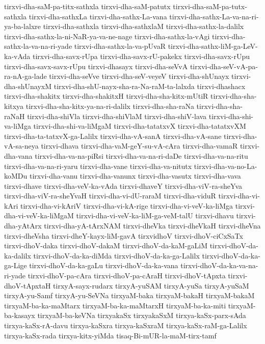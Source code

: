 {tirxvi-dha-saM-pa-titx-sathxla
tirxvi-dha-saM-patutx
tirxvi-dha-saM-pa-tutx-sathxla
tirxvi-dha-sathxLa
tirxvi-dha-sathx-La-vana
tirxvi-dha-sathx-La-va-na-ri-ya-ba-lalxre
tirxvi-dha-sathxla
tirxvi-dha-sathxlaM
tirxvi-dha-sathx-la-dalilx
tirxvi-dha-sathx-la-ni-NaR-ya-va-ne-nage
tirxvi-dha-sathx-la-vAgi
tirxvi-dha-sathx-la-va-na-ri-yade
tirxvi-dha-sathx-la-va-pUvaR
tirxvi-dha-sathx-liM-ga-LeV-ka-vAda
tirxvi-dha-savx-rUpa
tirxvi-dha-savx-rU-pakekx
tirxvi-dha-savx-rUpu
tirxvi-dha-savx-savx-rUpu
tirxvi-dhasayx
tirxvi-dha-seVvA
tirxvi-dha-seV-vA-pa-ra-nA-ga-lade
tirxvi-dha-seVve
tirxvi-dha-seV-veyeV
tirxvi-dha-shUnayx
tirxvi-dha-shUnayxM
tirxvi-dha-shU-nayx-sha-ra-Na-raM-ta-lalxda
tirxvi-dhashacx
tirxvi-dha-shakitx
tirxvi-dha-shakitxH
tirxvi-dha-sha-kitx-mUtiR
tirxvi-dha-sha-kitxya
tirxvi-dha-sha-kitx-ya-na-ri-dalilx
tirxvi-dha-sha-raNa
tirxvi-dha-sha-raNaH
tirxvi-dha-shiVla
tirxvi-dha-shiVlaM
tirxvi-dha-shiV-lava
tirxvi-dha-shi-va-liMga
tirxvi-dha-shi-va-liMgaM
tirxvi-dha-tatatxvX
tirxvi-dha-tatatxvXM
tirxvi-dha-ta-tatxvX-ga-Lalilx
tirxvi-dha-vA-sanA
tirxvi-dha-vA-sane
tirxvi-dha-vA-sa-neya
tirxvi-dhava
tirxvi-dha-vaM-geY-su-vA-cAra
tirxvi-dha-vamaR
tirxvi-dha-vana
tirxvi-dha-va-na-piRsi
tirxvi-dha-va-na-ri-daDe
tirxvi-dha-va-na-ritu
tirxvi-dha-va-na-ri-yaru
tirxvi-dha-vane
tirxvi-dha-va-nitutx
tirxvi-dha-va-no-La-koMDu
tirxvi-dha-vanu
tirxvi-dha-vanunx
tirxvi-dha-vasutx
tirxvi-dha-vava
tirxvi-dhave
tirxvi-dha-veV-ka-vAda
tirxvi-dhaveY
tirxvi-dha-viV-ra-sheYva
tirxvi-dha-viV-ra-sheYvaH
tirxvi-dha-vi-dU-raraM
tirxvi-dha-viduR
tirxvi-dha-vi-kAri
tirxvi-dha-vi-kAriV
tirxvi-dha-vi-kA-rige
tirxvi-dha-vi-veV-ka-liMga
tirxvi-dha-vi-veV-ka-liMgaM
tirxvi-dha-vi-veV-ka-liM-ga-veM-talU
tirxvi-dhavu
tirxvi-dha-yAtArx
tirxvi-dha-yA-tArxNAM
tirxvi-dheVka
tirxvi-dheVkaH
tirxvi-dheVna
tirxvi-dheVsha
tirxvi-dheY-kayx-liM-gavA
tirxvidhoV
tirxvi-dhoV-ciCxSaTx
tirxvi-dhoV-daka
tirxvi-dhoV-dakaM
tirxvi-dhoV-da-kaM-gaLiM
tirxvi-dhoV-da-ka-dalilx
tirxvi-dhoV-da-ka-diMda
tirxvi-dhoV-da-ka-ga-Lalilx
tirxvi-dhoV-da-ka-ga-Lige
tirxvi-dhoV-da-ka-gaLu
tirxvi-dhoV-da-ka-vana
tirxvi-dhoV-da-ka-va-na-ri-yade
tirxvi-dhoV-pa-cAra
tirxvi-dhoV-pa-cAraH
tirxvi-dhoV-tApxta
tirxvi-dhoV-tApxtaH
tirxyA-sayx-rudarx
tirxyA-yuSAM
tirxyA-yuSa
tirxyA-yuSaM
tirxyA-yu-Samf
tirxyA-yu-SeVNa
tirxyaM-baka
tirxyaM-bakaH
tirxyaM-bakaM
tirxyaM-ba-ka-maMtarx
tirxyaM-ba-ka-maMtarxH
tirxyaM-ba-ka-miti
tirxyaM-ba-kasayx
tirxyaM-ba-keVNa
tirxyakaSx
tirxyakaSxM
tirxya-kaSx-parx-sAda
tirxya-kaSx-rA-davu
tirxya-kaSxra
tirxya-kaSxraM
tirxya-kaSx-raM-ga-Lalilx
tirxya-kaSx-rada
tirxya-kitx-yiMda
tisaq-Bi-mUR-la-maM-tirx-tamf
}

